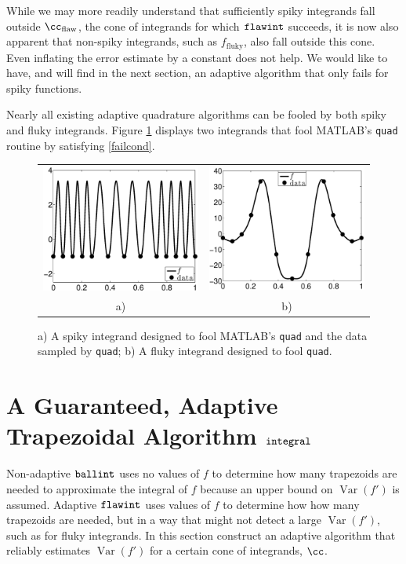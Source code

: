 \documentclass[]{article}
\DeclareMathOperator{\integ}{\texttt{\textup{integral}}}
\DeclareMathOperator{\flawinteg}{\texttt{\textup{flawint}}}
\DeclareMathOperator{\ballinteg}{\texttt{\textup{ballint}}}
\DeclareMathOperator{\Var}{Var}
\theoremstyle{definition}
\theoremstyle{remark}
\begin{document}
While we may more readily understand that sufficiently spiky integrands fall outside $\cc_{\text{flaw}}$, the cone of integrands for which $\flawinteg$ succeeds, it is now also apparent that non-spiky integrands, such as $f_{\text{fluky}}$, also fall outside this cone. Even inflating the error estimate by a constant does not help. We would like to have, and will find in the next section, an adaptive algorithm that only fails for spiky functions. 

Nearly all existing adaptive quadrature algorithms can be fooled by both spiky and fluky integrands.  Figure \ref{fig:foolquad} displays two integrands that fool MATLAB's {\tt quad} routine by satisfying \eqref{failcond}.

\begin{figure}
\centering 
\begin{tabular}{cc}
\includegraphics[width=5.5cm]{ExpositoryPaperSpikyquad.eps}
&
\includegraphics[width=5.5cm]{ExpositoryPaperFlukyquad.eps} \\
a) & b)
\end{tabular}
\caption{a) A spiky integrand designed to fool MATLAB's {\tt quad} and the data sampled by {\tt quad}; b) A fluky integrand designed to fool {\tt quad}. \label{fig:foolquad}}
\end{figure}

\section{A Guaranteed, Adaptive Trapezoidal Algorithm $\integ$} \label{newalgosec}

Non-adaptive $\ballinteg$ uses no values of $f$ to determine how many trapezoids are needed to approximate the integral of $f$ because an upper bound on $\Var(f')$ is assumed.  Adaptive $\flawinteg$ uses values of $f$ to determine how how many trapezoids are needed, but in a way that might not detect a large $\Var(f')$, such as for fluky integrands.  In this section construct an adaptive algorithm that reliably estimates $\Var(f')$ for a certain cone of integrands, $\cc$.
\end{document}
